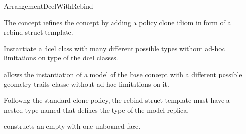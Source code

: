 \ccRefPageBegin

\begin{ccRefConcept}{ArrangementDcelWithRebind}

\ccDefinition

The concept \ccRefName{} refines the  concept by adding
a policy clone idiom in form of a rebind struct-template.

Instantiate a dcel{} class with many different possible types without ad-hoc limitations on type of the dcel classes.

\ccRefines
{}

\ccTypes
   {allows the instantiation of a model of the base concept
    with a different possible geometry-traits
   classe without ad-hoc limitations on it.

   Followng the standard clone policy, the rebind struct-template must
   have a nested type named  that defines the type of the
   model replica.}

\ccCreation
{}
  {constructs an empty \dcel{} with one unbouned face.}

\ccHasModels
  \\
  \\

\end{ccRefConcept}
\ccRefPageEnd
